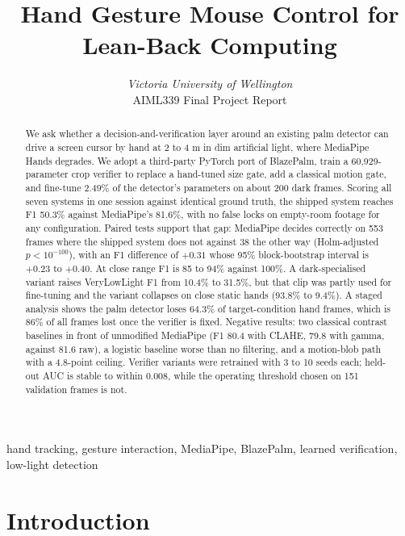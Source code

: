 \documentclass[conference,a4paper]{IEEEtran}
\begin{document}
\title{Hand Gesture Mouse Control for Lean-Back Computing}

\author{
\textit{Victoria University of Wellington}\\
AIML339 Final Project Report}

\maketitle

\begin{abstract}
We ask whether a decision-and-verification layer around an existing palm
detector can drive a screen cursor by hand at 2 to 4 m in dim artificial
light, where MediaPipe Hands degrades. We adopt a third-party PyTorch port
of BlazePalm, train a 60,929-parameter crop verifier to replace a hand-tuned
size gate, add a classical motion gate, and fine-tune 2.49\% of the
detector's parameters on about 200 dark frames. Scoring all seven systems in
one session against identical ground truth, the shipped system reaches F1
50.3\% against MediaPipe's 81.6\%, with no false locks on empty-room footage
for any configuration. Paired tests support that gap: MediaPipe decides
correctly on 553 frames where the shipped system does not against 38 the
other way (Holm-adjusted $p<10^{-100}$), with an F1 difference of $+0.31$
whose 95\% block-bootstrap interval is $+0.23$ to $+0.40$. At close range F1
is 85 to 94\% against 100\%. A dark-specialised variant raises
VeryLowLight F1 from 10.4\% to 31.5\%, but that clip was partly used for
fine-tuning and the variant collapses on close static hands (93.8\% to
9.4\%). A staged analysis shows the palm detector loses 64.3\% of
target-condition hand frames, which is 86\% of all frames lost once the
verifier is fixed. Negative results: two classical contrast baselines in
front of unmodified MediaPipe (F1 80.4 with CLAHE, 79.8 with gamma, against
81.6 raw), a logistic baseline worse than no filtering, and a motion-blob
path with a 4.8-point ceiling. Verifier variants were retrained with 3 to 10
seeds each; held-out AUC is stable to within 0.008, while the operating
threshold chosen on 151 validation frames is not.
\end{abstract}

\begin{IEEEkeywords}
hand tracking, gesture interaction, MediaPipe, BlazePalm, learned verification, low-light detection
\end{IEEEkeywords}

\section{Introduction}
\end{document}

